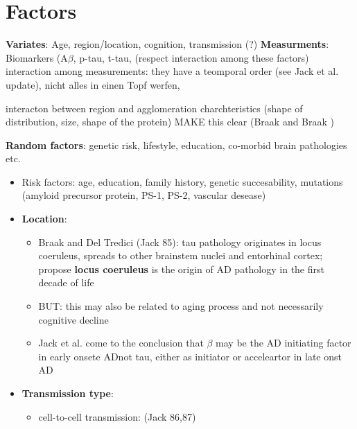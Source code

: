 \documentclass[fleqn]{article}\usepackage{caption}
\begin{document}
\section{Factors}
\textbf{Variates}: Age, region/location, cognition, transmission (?)
\textbf{Measurments}: Biomarkers (A$\beta$, p-tau, t-tau, 
(respect interaction among these factors)
interaction among measurements: they have a teomporal order (see Jack et al. update), nicht alles in einen Topf werfen, 

interacton between region and agglomeration charchteristics (shape of distribution, size, shape of the protein) MAKE this clear (Braak and Braak )

\textbf{Random factors}: genetic risk, lifestyle, education, co-morbid brain pathologies etc.

\begin{itemize}
\item Risk factors: age, education, family history, genetic succesability, mutations (amyloid precursor protein, PS-1, PS-2, vascular desease)

\item \textbf{Location}:
\begin{itemize}
\item Braak and Del Tredici (Jack 85): tau pathology originates in locus coeruleus, spreads to other brainstem nuclei and entorhinal cortex; propose \textbf{locus coeruleus} is the origin of AD pathology in the first decade of life
\item BUT: this may also be related to aging process and not necessarily cognitive decline
\item Jack et al. come to the conclusion that $\beta$ may be the AD initiating factor in early onsete ADnot tau, either as initiator or acceleartor in late onst AD
\end{itemize}

\item \textbf{Transmission type}:
\begin{itemize}
\item cell-to-cell transmission: (Jack 86,87)
\end{itemize}


\end{itemize}
\end{document}
